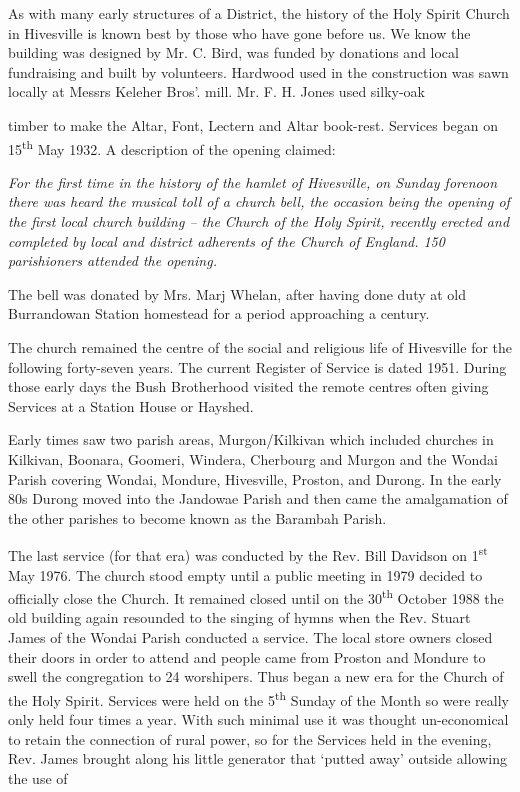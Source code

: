 As with many early structures of a District, the history of the Holy Spirit Church in Hivesville is known best by those who have gone before us. We know the building was designed by Mr. C. Bird, was funded by donations and local fundraising and built by volunteers. Hardwood used in the construction was sawn locally at Messrs Keleher Bros'. mill. Mr. F. H. Jones used silky-oak

timber to make the Altar, Font, Lectern and Altar book-rest. Services began on 15\textsuperscript{th} May 1932. A description of the opening claimed:

\emph{For the first time in the history of the hamlet of Hivesville, on Sunday forenoon there was heard the musical toll of a church bell, the occasion being the opening of the first local church building -- the Church of the Holy Spirit, recently erected and completed by local and district adherents of the Church of England. 150 parishioners attended the opening.}

The bell was donated by Mrs. Marj Whelan, after having done duty at old Burrandowan Station homestead for a period approaching a century.

The church remained the centre of the social and religious life of Hivesville for the following forty-seven years. The current Register of Service is dated 1951. During those early days the Bush Brotherhood visited the remote centres often giving Services at a Station House or Hayshed.

Early times saw two parish areas, Murgon/Kilkivan which included churches in Kilkivan, Boonara, Goomeri, Windera, Cherbourg and Murgon and the Wondai Parish covering Wondai, Mondure, Hivesville, Proston, and Durong. In the early 80s Durong moved into the Jandowae Parish and then came the amalgamation of the other parishes to become known as the Barambah Parish.

The last service (for that era) was conducted by the Rev. Bill Davidson on 1\textsuperscript{st} May 1976. The church stood empty until a public meeting in 1979 decided to officially close the Church. It remained closed until on the 30\textsuperscript{th} October 1988 the old building again resounded to the singing of hymns when the Rev. Stuart James of the Wondai Parish conducted a service. The local store owners closed their doors in order to attend and people came from Proston and Mondure to swell the congregation to 24 worshipers. Thus began a new era for the Church of the Holy Spirit. Services were held on the 5\textsuperscript{th} Sunday of the Month so were really only held four times a year. With such minimal use it was thought un-economical to retain the connection of rural power, so for the Services held in the evening, Rev. James brought along his little generator that `putted away' outside allowing the use of

